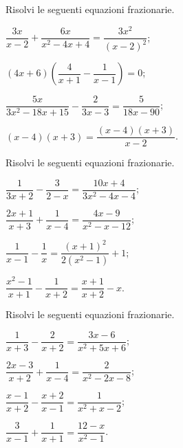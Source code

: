 \begin{esercizio}[\Ast]
\label{ese:20.23}
Risolvi le seguenti equazioni frazionarie.
\begin{multicols}{2}
\begin{enumeratea}
 \item $\dfrac{3x}{x-2}+\dfrac{6x}{x^{2}-4x+4}=\dfrac{3x^{2}}{(x-2)^{2}}$;
 \item $(4x+6)\left(\dfrac{4}{x+1}-\dfrac{1}{x-1}\right)=0$;
 \item $\dfrac{5x}{3x^{2}-18x+15}-\dfrac{2}{3x-3}=\dfrac{5}{18x-90}$;
 \item $(x-4)(x+3)=\dfrac{(x-4)(x+3)}{x-2}$.
\end{enumeratea}
\end{multicols}
\end{esercizio}
\begin{esercizio}[\Ast]
\label{ese:20.24}
Risolvi le seguenti equazioni frazionarie.
\begin{multicols}{2}
\begin{enumeratea}
 \item $\dfrac{1}{3x+2}-\dfrac{3}{2-x}=\dfrac{10x+4}{3x^{2}-4x-4}$;
 \item $\dfrac{2x+1}{x+3}+\dfrac{1}{x-4}=\dfrac{4x-9}{x^{2}-x-12}$;
 \item $\dfrac{1}{x-1}-\dfrac{1}{x}=\dfrac{(x+1)^{2}}{2(x^{2}-1)}+1$;
 \item $\dfrac{x^{2}-1}{x+1}-\dfrac{1}{x+2}=\dfrac{x+1}{x+2}-x$.
\end{enumeratea}
\end{multicols}
\end{esercizio}

\begin{esercizio}[\Ast]
\label{ese:20.25}
Risolvi le seguenti equazioni frazionarie.
\begin{multicols}{2}
\begin{enumeratea}
 \item $\dfrac{1}{x+3}-\dfrac{2}{x+2}=\dfrac{3x-6}{x^{2}+5x+6}$;
 \item $\dfrac{2x-3}{x+2}+\dfrac{1}{x-4}=\dfrac{2}{x^{2}-2x-8}$;
 \item $\dfrac{x-1}{x+2}-\dfrac{x+2}{x-1}=\dfrac{1}{x^{2}+x-2}$;
 \item $\dfrac{3}{x-1}+\dfrac{1}{x+1}=\dfrac{12-x}{x^{2}-1}$.
\end{enumeratea}
\end{multicols}
\end{esercizio}

